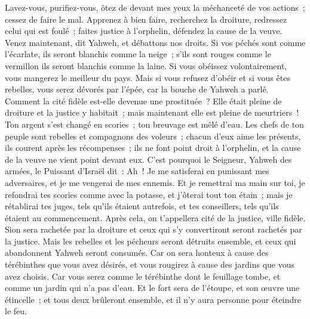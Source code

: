 \begin{multicols}{2}
Lavez-vous, purifiez-vous, ôtez de devant mes yeux la méchanceté de vos actions~; cessez de faire le mal.
Apprenez à bien faire, recherchez la droiture, redressez celui qui est foulé~; faites justice à l'orphelin, défendez la cause de la veuve.
Venez maintenant, dit Yahweh, et débattons nos droits. Si vos péchés sont comme l'écarlate, ils seront blanchis comme la neige~; s'ils sont rouges comme le vermillon ils seront blanchis comme la laine.
Si vous obéissez volontairement, vous mangerez le meilleur du pays.
Mais si vous refusez d'obéir et si vous êtes rebelles, vous serez dévorés par l'épée, car la bouche de Yahweh a parlé.
Comment la cité fidèle est-elle devenue une prostituée~? Elle était pleine de droiture et la justice y habitait~; mais maintenant elle est pleine de meurtriers~!
Ton argent s'est changé en scories~; ton breuvage est mêlé d'eau.
Les chefs de ton peuple sont rebelles et compagnons des voleurs~; chacun d'eux aime les présents, ils courent après les récompenses~; ils ne font point droit à l'orphelin, et la cause de la veuve ne vient point devant eux.
C'est pourquoi le Seigneur, Yahweh des armées, le Puissant d'Israël dit~: Ah~! Je me satisferai en punissant mes adversaires, et je me vengerai de mes ennemis.
Et je remettrai ma main sur toi, je refondrai tes scories comme avec la potasse, et j'ôterai tout ton étain~;
mais je rétablirai tes juges, tels qu'ils étaient autrefois, et tes conseillers, tels qu'ils étaient au commencement. Après cela, on t'appellera cité de la justice, ville fidèle.
Sion sera rachetée par la droiture et ceux qui s'y convertiront seront rachetés par la justice.
Mais les rebelles et les pécheurs seront détruits ensemble, et ceux qui abandonnent Yahweh seront consumés.
Car on sera honteux à cause des térébinthes que vous avez désirés, et vous rougirez à cause des jardins que vous avez choisis.
Car vous serez comme le térébinthe dont le feuillage tombe, et comme un jardin qui n'a pas d'eau.
Et le fort sera de l'étoupe, et son œuvre une étincelle~; et tous deux brûleront ensemble, et il n'y aura personne pour éteindre le feu.

\end{multicols}
